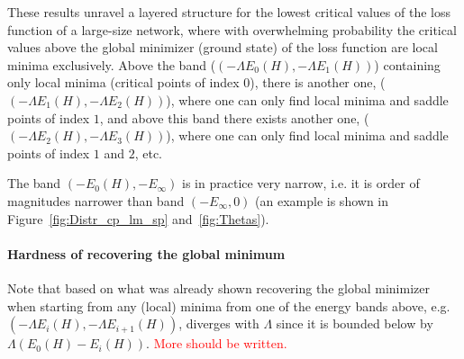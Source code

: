 \documentclass[twoside]{article}
\begin{document}
These results unravel a layered structure for the lowest critical values of the loss function of a large-size network, where with overwhelming probability the critical values above the global minimizer (ground state) of the loss function are local minima exclusively. Above the band ($\left(-\Lambda E_0(H),-\Lambda E_1(H)\right)$) containing only local minima (critical points of index $0$), there is another one, ($\left(-\Lambda E_1(H),-\Lambda E_2(H)\right)$), where one can only find local minima and saddle points of index $1$, and above this band there exists another one, ($\left(-\Lambda E_2(H),-\Lambda E_3(H)\right)$), where one can only find local minima and saddle points of index $1$ and $2$, etc. 

The band $(-E_0(H),-E_{\infty})$ is in practice very narrow, i.e. it is order of magnitudes narrower than band $(-E_{\infty},0)$ (an example is shown in Figure~\ref{fig:Distr_cp_lm_sp} and~\ref{fig:Thetas}). 

\paragraph{Hardness of recovering the global minimum}
Note that based on what was already shown recovering the global minimizer when starting from any (local) minima from one of the energy bands above, e.g. $\left(-\Lambda E_i(H),-\Lambda E_{i+1}(H)\right)$, diverges with $\Lambda$ since it is bounded below by $\Lambda (E_0(H) - E_i(H))$. \textcolor{red}{More should be written.}
\end{document}
